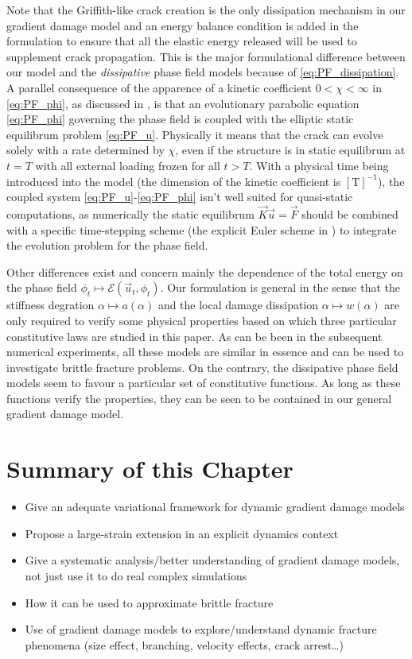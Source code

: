 Note that the Griffith-like crack creation is the only dissipation mechanism in our gradient damage model and an energy balance condition is added in the formulation to ensure that all the elastic energy released will be used to supplement crack propagation. This is the major formulational difference between our model and the \emph{dissipative} phase field models because of \eqref{eq:PF_dissipation}. A parallel consequence of the apparence of a kinetic coefficient $0<\chi<\infty$ in \eqref{eq:PF_phi}, as discussed in \cite{Bourdin:2011}, is that an evolutionary parabolic equation \eqref{eq:PF_phi} governing the phase field is coupled with the elliptic static equilibrum problem \eqref{eq:PF_u}. Physically it means that the crack can evolve solely with a rate determined by $\chi$, even if the structure is in static equilibrum at $t=T$ with all external loading frozen for all $t>T$. With a physical time being introduced into the model (the dimension of the kinetic coefficient is $[\mathrm{T}]^{-1}$), the coupled system \eqref{eq:PF_u}-\eqref{eq:PF_phi} isn't well suited for quasi-static computations, as numerically the static equilibrum  $\vec{K}\vec{u}=\vec{F}$ should be combined with a specific time-stepping scheme (the explicit Euler scheme in \cite{HakimKarma:2009}) to integrate the evolution problem for the phase field.

Other differences exist and concern mainly the dependence of the total energy on the phase field $\phi_t\mapsto\mathcal{E}(\vec{u}_t,\phi_t)$. Our formulation is general in the sense that the stiffness degration $\alpha\mapsto a(\alpha)$ and the local damage dissipation $\alpha\mapsto w(\alpha)$ are only required to verify some physical properties based on which three particular constitutive laws are studied in this paper. As can be been in the subsequent numerical experiments, all these models are similar in essence and can be used to investigate brittle fracture problems. On the contrary, the dissipative phase field models \cite{KarmaKesslerLevine:2001,HakimKarma:2009} seem to favour a particular set of constitutive functions. As long as these functions verify the properties, they can be seen to be contained in our general gradient damage model.

\section*{Summary of this Chapter} \label{sec:summarychap1}
\begin{itemize}
\item Give an adequate variational framework for dynamic gradient damage models
\item Propose a large-strain extension in an explicit dynamics  context
\item Give a systematic analysis/better understanding of gradient damage models, not just use it to do real complex simulations
\item How it can be used to approximate brittle fracture
\item Use of gradient damage models to explore/understand dynamic fracture phenomena (size effect, branching, velocity effects, crack arrest\ldots)
\end{itemize}